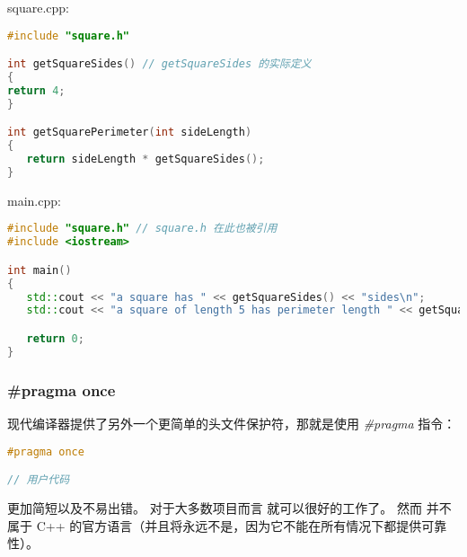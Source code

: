 \documentclass[../../LearnCpp.tex]{subfiles}
\begin{document}
square.cpp:

\begin{lstlisting}[language=C++]
#include "square.h"

int getSquareSides() // getSquareSides 的实际定义
{
return 4;
}

int getSquarePerimeter(int sideLength)
{
   return sideLength * getSquareSides();
}
\end{lstlisting}

main.cpp:

\begin{lstlisting}[language=C++]
#include "square.h" // square.h 在此也被引用
#include <iostream>

int main()
{
   std::cout << "a square has " << getSquareSides() << "sides\n";
   std::cout << "a square of length 5 has perimeter length " << getSquarePerimeter(5) << '\n';

   return 0;
}
\end{lstlisting}

\subsubsection*{\#pragma once}

现代编译器提供了另外一个更简单的头文件保护符，那就是使用 \textit{\#pragma} 指令：

\begin{lstlisting}[language=C++]
#pragma once

// 用户代码
\end{lstlisting}

 更加简短以及不易出错。
对于大多数项目而言  就可以很好的工作了。
然而  并不属于 C++ 的官方语言（并且将永远不是，因为它不能在所有情况下都提供可靠性）。
\end{document}

